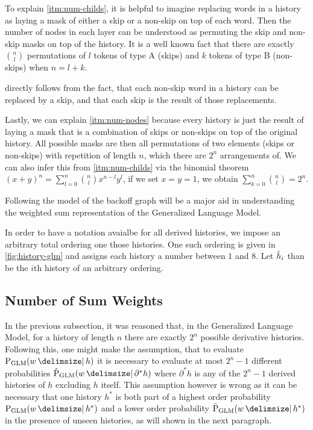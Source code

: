 To explain \cref{itm:num-childs}, it is helpful to imagine replacing words in
a history as laying a mask of either a skip or a non-skip on top of each word.
Then the number of nodes in each layer can be understood as permuting the
skip and non-skip masks on top of the history.
It is a well known fact that there are exactly $\binom{n}{l}$ permutations of
$l$ tokens of type A (skips) and $k$ tokens of type B (non-skips) when
$n = l + k$.

 directly follows from the fact, that each non-skip word
in a history can be replaced by a skip, and that each skip is the result
of those replacements.

Lastly, we can explain \cref{itm:num-nodes} because every history is just the
result of laying a mask that is a combination of skips or non-skips on top of
the original history.
All possible masks are then all permutations of two elements (skips or
non-skips) with repetition of length $n$, which there are $2^n$ arrangements of.
We can also infer this from \cref{itm:num-childs} via the binomial theorem
$(x+ y)^n = \sum_{l=0}^n \binom{n}{l} x^{n-l} y^l$, if we set ${x = y = 1}$,
we obtain $\sum_{k=0}^n \binom{n}{l} = 2^n$.

Following the model of the backoff graph will be a major aid in understanding
the weighted sum representation of the Generalized Language Model.

In order to have a notation avaialbe for all derived histories, we impose an
arbitrary total ordering one those histories.
One such ordering is given in \cref{fig:history-glm} and assigns each history
a number between $1$ and $8$.
Let $\DerivedHistory[i]$ than be the $i$th history of an arbitrary ordering.

\subsection{Number of Sum Weights}

In the previous subsection, it was reasoned that, in the Generalized Language
Model, for a history of length $n$ there are exactly $2^n$ possible derivative
histories.
Following this, one might make the assumption, that to evaluate $\ProbGLM{w}{h}$
it is necessary to evaluate at most $2^n - 1$  different probabilities
$\ProbGLM*{w}{\partial^* h}$ where $\partial^* h$ is any of the $2^n - 1$
derived histories of $h$ excluding $h$ itself.
This assumption however is wrong as it can be necessary that one history $h^*$
is both part of a highest order probability $\ProbGLM{w}{h^*}$ and a lower order
probability $\ProbGLM*{w}{h^*}$ in the presence of unseen histories, as will
shown in the next paragraph.

